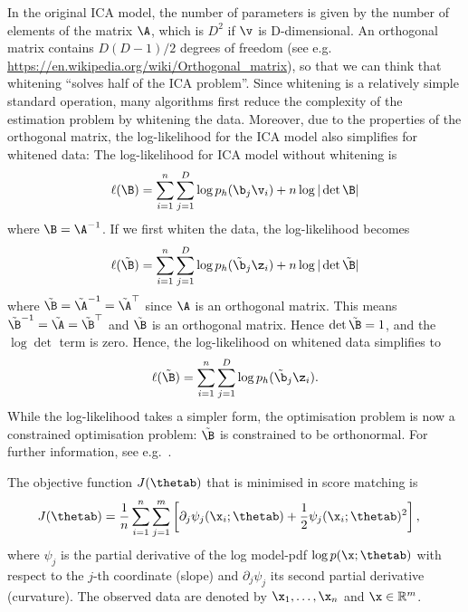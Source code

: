 \begin{exenumerate}
\begin{solution}
  In the original ICA model, the number of parameters is given by the
  number of elements of the matrix $\A$, which is $D^2$ if $\v$ is
  D-dimensional. An orthogonal matrix contains $D(D-1)/2$ degrees of
  freedom {\small (see
    e.g. \url{https://en.wikipedia.org/wiki/Orthogonal_matrix}}), so
  that we can think that whitening ``solves half of the ICA
  problem''. Since whitening is a relatively simple standard
  operation, many algorithms \citep[e.g.\ ``fastICA'',][]{Hyvarinen1999}
  first reduce the complexity of the estimation problem by whitening
  the data. Moreover, due to the properties of the orthogonal matrix,
  the log-likelihood for the ICA model also simplifies for whitened
  data: The log-likelihood for ICA model without whitening is
  \begin{equation}
    \ell(\B) = \sum_{i=1}^n  \sum_{j=1}^D\log p_h (\b_j \v_i) + n \log |\det \B|
  \end{equation}
  where $\B = \A^{-1}$. If we first whiten the data, the log-likelihood becomes
  \begin{equation}
    \ell(\tilde{\B}) = \sum_{i=1}^n  \sum_{j=1}^D\log p_h (\tilde{\b}_j \z_i) + n \log |\det \tilde{\B}|
  \end{equation}
  where $\tilde{\B} = \tilde{\A}^{-1} =\tilde{\A}^\top$ since $\A$ is
  an orthogonal matrix. This means $\tilde{\B}^{-1} = \tilde{\A} =
  \tilde{\B}^\top$ and $\tilde{\B}$ is an orthogonal matrix. Hence
  $\det \tilde{\B}=1$, and the $\log \det$ term is zero. Hence, the
  log-likelihood on whitened data simplifies to
   \begin{equation}
    \ell(\tilde{\B}) = \sum_{i=1}^n  \sum_{j=1}^D\log p_h (\tilde{\b}_j \z_i).
  \end{equation}
   While the log-likelihood takes a simpler form, the optimisation
   problem is now a constrained optimisation problem: $\tilde{\B}$ is
   constrained to be orthonormal. For further information, see
   e.g.\ \citep[Chapter 9]{Hyvarinen2001}.  
   
  \end{solution}
  
\end{exenumerate}



\label{ex:score-matching-exp-family}
The objective function $J(\thetab)$ that is minimised in score matching is
    \begin{align} 
      J(\thetab) &= \frac{1}{n} \sum_{i=1}^n \sum_{j=1}^m \left[ \partial_j
        \psi_j(\x_i;\thetab) + \frac{1}{2} \psi_j(\x_i;\thetab)^2 \right],\label{eq:Jsm-def}
    \end{align}
where $\psi_j$ is the partial derivative of the log model-pdf $\log
p(\x ;\thetab)$ with respect to the $j$-th coordinate (slope) and
$\partial_j \psi_j$ its second partial derivative (curvature). The
observed data are denoted by $\x_1,\ldots,\x_n$ and $\x \in
\mathbb{R}^m$.

